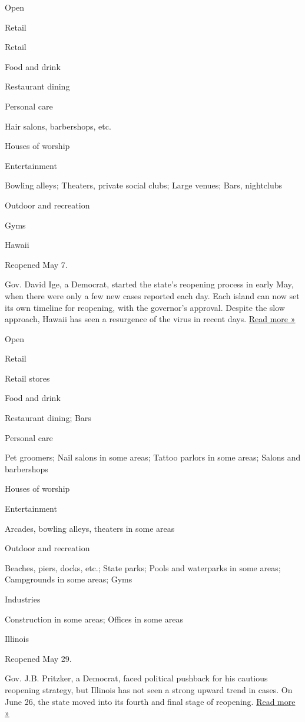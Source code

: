 Open

Retail

Retail

Food and drink

Restaurant dining

Personal care

Hair salons, barbershops, etc.

Houses of worship

Entertainment

Bowling alleys; Theaters, private social clubs; Large venues; Bars,
nightclubs

Outdoor and recreation

Gyms

Hawaii

Reopened May 7.

Gov. David Ige, a Democrat, started the state's reopening process in
early May, when there were only a few new cases reported each day. Each
island can now set its own timeline for reopening, with the governor's
approval. Despite the slow approach, Hawaii has seen a resurgence of the
virus in recent days.
\href{https://www.bigislandvideonews.com/2020/06/04/hawaii-economic-reopening-strategy-posted-online/}{Read
more »}

Open

Retail

Retail stores

Food and drink

Restaurant dining; Bars

Personal care

Pet groomers; Nail salons in some areas; Tattoo parlors in some areas;
Salons and barbershops

Houses of worship

Entertainment

Arcades, bowling alleys, theaters in some areas

Outdoor and recreation

Beaches, piers, docks, etc.; State parks; Pools and waterparks in some
areas; Campgrounds in some areas; Gyms

Industries

Construction in some areas; Offices in some areas

Illinois

Reopened May 29.

Gov. J.B. Pritzker, a Democrat, faced political pushback for his
cautious reopening strategy, but Illinois has not seen a strong upward
trend in cases. On June 26, the state moved into its fourth and final
stage of reopening.
\href{https://www.wbez.org/stories/use-this-tool-to-track-illinois-reopening-plan-by-phase-region-and-address/51871836-6a73-47dc-a8f1-18c6fe2f2a6e}{Read
more »}

